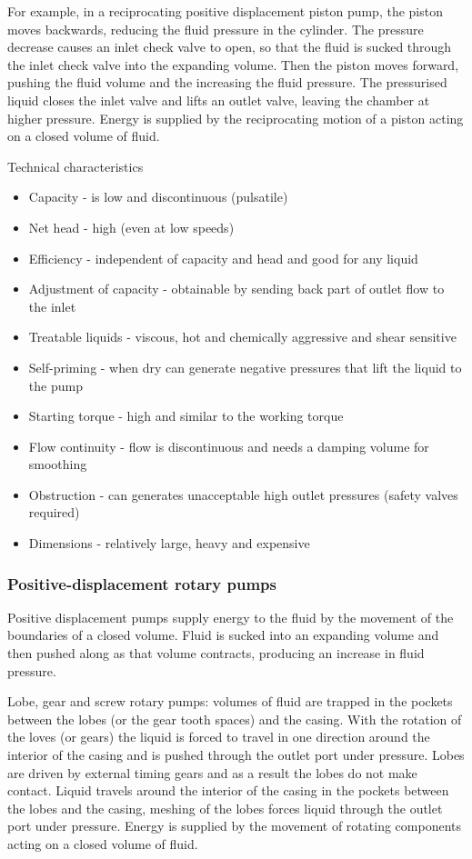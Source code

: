 \documentclass[class=report, crop=false, 12pt,a4paper]{standalone}
\begin{document}
For example, in a reciprocating positive displacement piston pump, the piston moves backwards, reducing the fluid pressure in the cylinder. The pressure decrease causes an inlet check valve to open, so that the fluid is sucked through the inlet check valve into the expanding volume. Then the piston moves forward, pushing the fluid volume and the increasing the fluid pressure. The pressurised liquid closes the inlet valve and lifts an outlet valve, leaving the chamber at higher pressure. Energy is supplied by the reciprocating motion of a piston acting on a closed volume of fluid.

Technical characteristics
\begin{itemize}
  \item Capacity - is low and discontinuous (pulsatile)
  \item Net head - high (even at low speeds)
  \item Efficiency - independent of capacity and head and good for any liquid
  \item Adjustment of capacity - obtainable by sending back part of outlet flow to the inlet
  \item Treatable liquids - viscous, hot and chemically aggressive and shear sensitive
  \item Self-priming - when dry can generate negative pressures that lift the liquid to the pump
  \item Starting torque - high and similar to the working torque
  \item Flow continuity - flow is discontinuous and needs a damping volume for smoothing
  \item Obstruction - can generates unacceptable high outlet pressures (safety valves required)
  \item Dimensions - relatively large, heavy and expensive
\end{itemize}
\subsubsection*{Positive-displacement rotary pumps}
Positive displacement pumps supply energy to the fluid by the movement of the boundaries of a closed volume. Fluid is sucked into an expanding volume and then pushed along as that volume contracts, producing an increase in fluid pressure.

Lobe, gear and screw rotary pumps: volumes of fluid are trapped in the pockets between the lobes (or the gear tooth spaces) and the casing. With the rotation of the loves (or gears) the liquid is forced to travel in one direction around the interior of the casing and is pushed through the outlet port under pressure. Lobes are driven by external timing gears and as a result the lobes do not make contact. Liquid travels around the interior of the casing in the pockets between the lobes and the casing, meshing of the lobes forces liquid through the outlet port under pressure. Energy is supplied by the movement of rotating components acting on a closed volume of fluid. 
\end{document}

